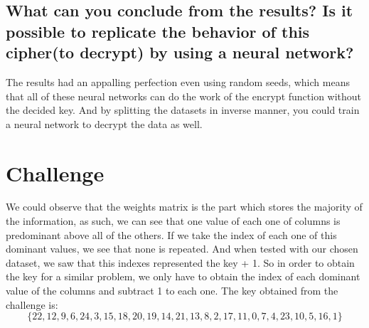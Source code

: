 \documentclass{article}
\begin{document}
\subsection*{What can you conclude from the results? Is it possible to replicate the behavior of this cipher(to decrypt) by using a neural network?}
The results had an appalling perfection even using random seeds, which means that all of these neural networks can do the work of the encrypt function without the decided key. And by splitting the datasets in inverse manner, you could train a neural network to decrypt the data as well.
\section{Challenge}
We could observe that the weights matrix is the part which stores the majority of the information, as such, we can see that one value of each one of columns is predominant above all of the others. If we take the index of each one of this dominant values, we see that none is repeated. And when tested with our chosen dataset, we saw that this indexes represented the key + 1. So in order to obtain the key for a similar problem, we only have to obtain the index of each dominant value of the columns and subtract 1 to each one.
The key obtained from the challenge is:
\[\{22, 12, 9, 6, 24, 3, 15, 18, 20, 19, 14, 21, 13, 8, 2, 17, 11, 0, 7, 4, 23, 10, 5, 16, 1\}\]
\end{document}
